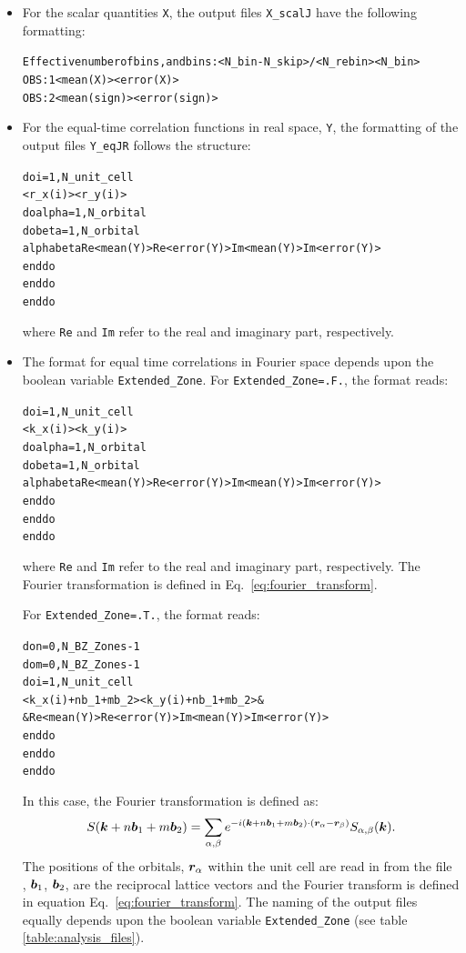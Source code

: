 \begin{itemize}
	\item For the scalar quantities \texttt{X}, the output files  \texttt{X\_scalJ} have the following formatting:
	{\small \begin{alltt}
		Effective number of bins, and bins:  <N_bin - N_skip>/<N_rebin>  <N_bin>	
		OBS :  1    <mean(X)>      <error(X)>	
		OBS :  2    <mean(sign)>   <error(sign)>
	\end{alltt} }
	
	\item For the equal-time correlation functions  in   real  space,  \texttt{Y}, the formatting of the output files \texttt{Y\_eqJR}  follows the structure:
	{\small \begin{alltt}
		do i = 1, N_unit_cell
		   <r_x(i)>   <r_y(i)>
		   do alpha = 1, N_orbital
		      do beta  = 1, N_orbital
		         alpha  beta  Re<mean(Y)>  Re<error(Y)>  Im<mean(Y)>  Im<error(Y)>
		      enddo
		   enddo
		enddo
	\end{alltt} }
	where \texttt{Re} and \texttt{Im} refer to the real and imaginary part, respectively.   
		
	\item  The  format  for   equal  time  correlations in  Fourier  space  depends  upon    the   boolean  variable   \texttt{Extended\_Zone}.  
	 For  \texttt{Extended\_Zone=.F.},   the  format  reads: 
	 {\small \begin{alltt}
		do i = 1, N_unit_cell
		   <k_x(i)>   <k_y(i)>
		   do alpha = 1, N_orbital
		      do beta  = 1, N_orbital
		         alpha  beta  Re<mean(Y)>  Re<error(Y)>  Im<mean(Y)>  Im<error(Y)>
		      enddo
		   enddo
		enddo
	\end{alltt} }
	where \texttt{Re} and \texttt{Im} refer to the real and imaginary part, respectively.  The  Fourier   transformation  is   
	defined  in Eq.~\ref{eq:fourier_transform}.  

	For  \texttt{Extended\_Zone=.T.},   the  format  reads: 
	 {\small \begin{alltt}
		do n = 0, N_BZ_Zones -1 
		   do m = 0, N_BZ_Zones 	-1
		        do  i  =  1,N_unit_cell 
		              <k_x(i) +  n b_1 + m b_2 >   <k_y(i) + n b_1 +  m b_2 >   & 
		                     &    Re<mean(Y)>  Re<error(Y)>  Im<mean(Y)>  Im<error(Y)>
		        enddo
		   enddo
		enddo
	\end{alltt} }
	In  this  case,  the  Fourier  transformation is    defined  as: 
	\begin{equation}
		S( \boldsymbol{k} +  n \boldsymbol{b}_1  + m \boldsymbol{b}_2)   =    \sum_{\alpha,\beta} e^{- i \left( \boldsymbol{k} +  n \boldsymbol{b}_1  + m \boldsymbol{b}_2 \right) \cdot   \left( \boldsymbol{r}_{\alpha} -  \boldsymbol{r}_{\beta} \right)  } S_{\alpha,\beta}(\boldsymbol{k} ).  
		\label{eq:extended_zone}
	\end{equation}   
	The  positions  of  the orbitals, $\boldsymbol{r}_{\alpha}$  within the  unit  cell  are   read in from  the  file  ,  $\boldsymbol{b}_1$, $\boldsymbol{b}_2$, are  the  
	reciprocal lattice  vectors  and  the Fourier  transform is  defined in equation  Eq.~\ref{eq:fourier_transform}.
	The naming of the output files equally depends upon the boolean variable \texttt{Extended\_Zone} (see table \ref{table:analysis_files}).
	

\end{itemize}
